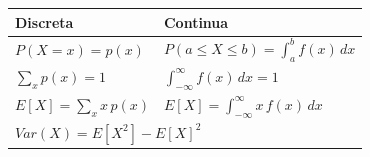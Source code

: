 \begin{center}
\renewcommand{\arraystretch}{1.5}\setlength{\tabcolsep}{10pt}
\begin{tabular}{ll}
	\textbf{Discreta} & \textbf{Continua} \\ \hline
	$P(X = x) = p(x)$ & $P(a \le X \le b) = \int_a^b f(x)\,dx$ \\
	$\sum_x p(x) = 1$ & $\int_{-\infty}^{\infty} f(x)\,dx = 1$ \\
	$E[X] = \sum_x x\,p(x)$ & $E[X] = \int_{-\infty}^{\infty} x\,f(x)\,dx$ \\
	\multicolumn{2}{l}{$Var(X) = E[X^2] - E[X]^2$} \\
\end{tabular}
\end{center}
